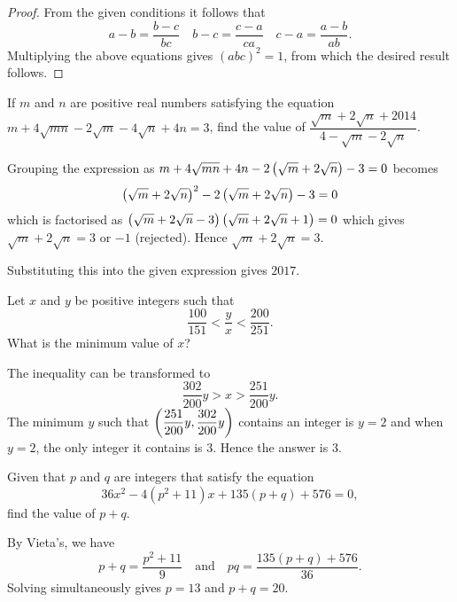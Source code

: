 \begin{proof}
From the given conditions it follows that
\[ a-b=\frac{b-c}{bc} \quad b-c=\frac{c-a}{ca} \quad c-a=\frac{a-b}{ab}. \]
Multiplying the above equations gives $(abc)^2=1$, from which the desired result follows.
\end{proof}
\pagebreak

\begin{prbm}
If $m$ and $n$ are positive real numbers satisfying the equation $m+4\sqrt{mn}-2\sqrt{m}-4\sqrt{n}+4n=3$, find the value of $\dfrac{\sqrt{m}+2\sqrt{n}+2014}{4-\sqrt{m}-2\sqrt{n}}$.
\end{prbm}
\begin{solution}
Grouping the expression as $m+4\sqrt{mn}+4n-2\left(\sqrt{m}+2\sqrt{n}\right)-3=0$ becomes 
\[ \left(\sqrt{m}+2\sqrt{n}\right)^2-2\left(\sqrt{m}+2\sqrt{n}\right)-3=0 \]
which is factorised as $\left(\sqrt{m}+2\sqrt{n}-3\right)\left(\sqrt{m}+2\sqrt{n}+1\right)=0$ which gives $\sqrt{m}+2\sqrt{n}=3$ or $-1$ (rejected). Hence $\sqrt{m}+2\sqrt{n}=3$.

Substituting this into the given expression gives $\boxed{2017}$.
\end{solution}
\pagebreak

\begin{prbm}
Let $x$ and $y$ be positive integers such that
\[ \frac{100}{151}<\frac{y}{x}<\frac{200}{251}. \]
What is the minimum value of $x$?
\end{prbm}

\begin{solution}
The inequality can be transformed to
\[ \frac{302}{200}y>x>\frac{251}{200}y. \]
The minimum $y$ such that $\left(\dfrac{251}{200}y,\dfrac{302}{200}y\right)$ contains an integer is $y=2$ and when $y=2$, the only integer it contains is $3$. Hence the answer is $3$.
\end{solution}
\pagebreak

\begin{prbm}
Given that $p$ and $q$ are integers that satisfy the equation
\[ 36x^2-4(p^2+11)x+135(p+q)+576=0, \]
find the value of $p+q$.
\end{prbm}

\begin{solution}
By Vieta's, we have
\[ p+q=\frac{p^2+11}{9} \quad \text{and} \quad pq=\frac{135(p+q)+576}{36}. \]
Solving simultaneously gives $p=13$ and $p+q=20$.
\end{solution}
\pagebreak

